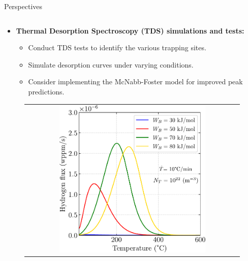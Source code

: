 \documentclass[9pt]{beamer}
\begin{document}

\begin{frame}{Perspectives}

    \begin{columns}

        \begin{column}{0.5\textwidth}
			\begin{itemize}
				\item \textbf{Thermal Desorption Spectroscopy (TDS) simulations and tests:} 
				\vspace{0.15cm}
				\begin{itemize}
					\item Conduct TDS tests to identify the various trapping sites.
					\vspace{0.15cm}
					\item Simulate desorption curves under varying conditions. 
					\vspace{0.15cm}
					\item Consider implementing the McNabb-Foster model for improved peak predictions.
				\end{itemize}
			\end{itemize}
			
			\begin{figure}
        		\begin{tabular}{c}
            		\includegraphics[width=0.7\textwidth]{Images/plot_TDS_WB.pdf} \\
        		\end{tabular}
    		\end{figure}
    		

\end{column}
\end{columns}
\end{frame}
\end{document}
